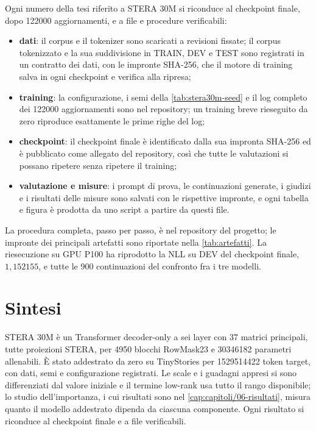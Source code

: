 Ogni numero della tesi riferito a STERA 30M si riconduce al checkpoint finale, dopo \num{122000} aggiornamenti, e a file e procedure verificabili:
\begin{itemize}
\item \textbf{dati}: il corpus e il tokenizer sono scaricati a revisioni fissate; il corpus tokenizzato e la sua suddivisione in TRAIN, DEV e TEST sono registrati in un contratto dei dati, con le impronte SHA-256, che il motore di training salva in ogni checkpoint e verifica alla ripresa;
\item \textbf{training}: la configurazione, i semi della \autoref{tab:stera30m-seed} e il log completo dei \num{122000} aggiornamenti sono nel repository; un training breve rieseguito da zero riproduce esattamente le prime righe del log;
\item \textbf{checkpoint}: il checkpoint finale è identificato dalla sua impronta SHA-256 ed è pubblicato come allegato del repository, così che tutte le valutazioni si possano ripetere senza ripetere il training;
\item \textbf{valutazione e misure}: i prompt di prova, le continuazioni generate, i giudizi e i risultati delle misure sono salvati con le rispettive impronte, e ogni tabella e figura è prodotta da uno script a partire da questi file.
\end{itemize}
La procedura completa, passo per passo, è nel repository del progetto; le impronte dei principali artefatti sono riportate nella \autoref{tab:artefatti}. La riesecuzione su GPU P100 ha riprodotto la NLL su DEV del checkpoint finale, $1{,}152155$, e tutte le 900 continuazioni del confronto fra i tre modelli.

\section{Sintesi}

STERA 30M è un Transformer decoder-only a sei layer con 37 matrici principali, tutte proiezioni STERA, per \num{4950} blocchi RowMask23 e \num{30346182} parametri allenabili. È stato addestrato da zero su TinyStories per \num{1529514422} token target, con dati, semi e configurazione registrati. Le scale e i guadagni appresi si sono differenziati dal valore iniziale e il termine low-rank usa tutto il rango disponibile; lo studio dell'importanza, i cui risultati sono nel \autoref{cap:capitoli/06-risultati}, misura quanto il modello addestrato dipenda da ciascuna componente. Ogni risultato si riconduce al checkpoint finale e a file verificabili.
